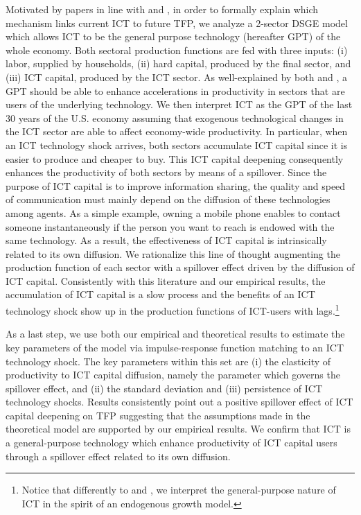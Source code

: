 \documentclass[12pt]{article}
\begin{document}
Motivated by papers in line with \cite{oliner2000resurgence} and \cite{stiroh2002information}, in order to formally explain which mechanism links current ICT to future TFP, we analyze a 2-sector DSGE model which allows ICT to be the general purpose technology (hereafter GPT) of the whole economy. Both sectoral production functions are fed with three inputs: (i) labor, supplied by households, (ii) hard capital, produced by the final sector, and (iii) ICT capital, produced by the ICT sector. As well-explained by both \cite{basu2003case} and \cite{basu2007information}, a GPT should be able to enhance accelerations in productivity in sectors that are users of the underlying technology. We then interpret ICT as the GPT of the last 30 years of the U.S. economy assuming that exogenous technological changes in the ICT sector are able to affect economy-wide productivity. In particular, when an ICT technology shock arrives, both sectors accumulate ICT capital since it is easier to produce and cheaper to buy. This ICT capital deepening consequently enhances the productivity of both sectors by means of a spillover. Since the purpose of ICT capital is to improve information sharing, the quality and speed of communication must mainly depend on the diffusion of these technologies among agents. As a simple example, owning a mobile phone enables to contact someone instantaneously if the person you want to reach is endowed with the same technology. As a result, the effectiveness of ICT capital is intrinsically related to its own diffusion. We rationalize this line of thought augmenting the production function of each sector with a spillover effect driven by the diffusion of ICT capital. Consistently with this literature and our empirical results, the accumulation of ICT capital is a slow process and the benefits of an ICT technology shock show up in the production functions of ICT-users with lags.\footnote{Notice that differently to \cite{basu2003case} and \cite{basu2007information}, we interpret the general-purpose nature of ICT in the spirit of an endogenous growth model.}

As a last step, we use both our empirical and theoretical results to estimate the key parameters of the model via impulse-response function matching to an ICT technology shock. The key parameters within this set are (i) the elasticity of productivity to ICT capital diffusion, namely the parameter which governs the spillover effect, and (ii) the standard deviation and (iii) persistence of ICT technology shocks. Results consistently point out a positive spillover effect of ICT capital deepening on TFP suggesting that the assumptions made in the theoretical model are supported by our empirical results. We confirm that ICT is a general-purpose technology which enhance productivity of ICT capital users through a spillover effect related to its own diffusion.
\end{document}
